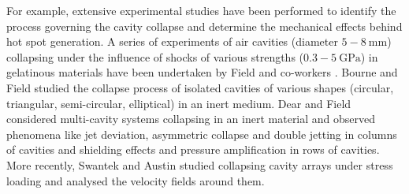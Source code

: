 \documentclass[3p,times,twocolumn]{elsarticle}
\begin{document}
For example, extensive experimental studies have been performed to identify the process governing the cavity collapse and determine the mechanical effects behind hot spot generation. A series of experiments of  air cavities (diameter $5-\SI{8}{\milli \meter}$) collapsing under the influence of shocks of various strengths ($0.3-\SI{5}{\giga \pascal}$) in gelatinous materials have been undertaken by Field and co-workers \cite{dear1988study,bourne1992shock}.
Bourne and Field \cite{bourne1992shock} studied the collapse process of isolated cavities of various shapes (circular, triangular, semi-circular, elliptical) in an inert medium. Dear and Field \cite{dear1988study} considered multi-cavity systems collapsing in an inert material and observed phenomena like jet deviation, asymmetric collapse and double jetting in columns of cavities and shielding effects and pressure amplification in rows of cavities. More recently, Swantek and Austin \cite{swantek2010collapse,swantek2010effect} studied collapsing cavity arrays under stress loading and analysed the velocity fields around them. 
\end{document}
